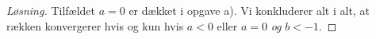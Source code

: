 \begin{opg}
\begin{enumerate}
\begin{proof}[Løsning]
			
			Tilfældet $ a=0 $ er dækket i opgave a). Vi konkluderer alt i alt, at rækken konvergerer hvis og kun hvis $ a<0 $ eller $ a=0 $ \emph{og} $ b<-1 $.
		\end{proof}
		\fi
	\end{enumerate}
\end{opg}

